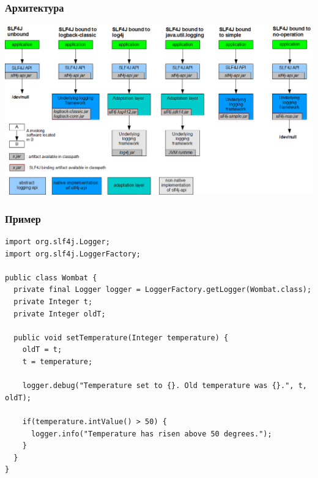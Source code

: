 \documentclass[xetex,mathserif,serif]{beamer}
\begin{document}
	\begin{frame}
		\frametitle{Архитектура}
		\begin{center}
			\includegraphics[width=\textwidth]{slf4jBindings.png}
		\end{center}
	\end{frame}

	\begin{frame}[fragile]
		\frametitle{Пример}
		\begin{footnotesize}
			\begin{verbatim}
import org.slf4j.Logger;
import org.slf4j.LoggerFactory;

public class Wombat {
  private final Logger logger = LoggerFactory.getLogger(Wombat.class);
  private Integer t;
  private Integer oldT;

  public void setTemperature(Integer temperature) {
    oldT = t;
    t = temperature;

    logger.debug("Temperature set to {}. Old temperature was {}.", t, oldT);

    if(temperature.intValue() > 50) {
      logger.info("Temperature has risen above 50 degrees.");
    }
  }
} 
			\end{verbatim}
		\end{footnotesize}
	\end{frame}
\end{document}

